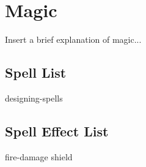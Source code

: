\chapter{Magic}\label{magic}

\begin{multicols*}{2}
    Insert a brief explanation of magic...
    
    \section{Spell List}
    
    {designing-spells}
	
    \section{Spell Effect List}
    {fire-damage}
    {shield}

\end{multicols*}
